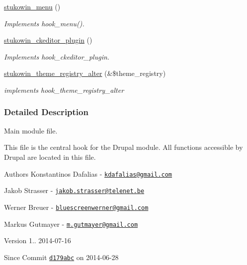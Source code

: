 \begin{DoxyCompactItemize}
\hyperlink{group___stukowin___module_ga59cfbad113b7aa2d10f0b204a5f7ba0d}{stukowin\+\_\+menu} ()
\begin{DoxyCompactList}\small\item\em Implements hook\+\_\+menu(). \end{DoxyCompactList}\item 
\hyperlink{group___drupal2_a_g_g_gae3c906d1ab9c3d8ed245d58c1ebf2a4a}{stukowin\+\_\+ckeditor\+\_\+plugin} ()
\begin{DoxyCompactList}\small\item\em Implements hook\+\_\+ckeditor\+\_\+plugin. \end{DoxyCompactList}\item 
\hyperlink{group___drupal2_a_g_g_ga3bf2203298453c41bf9a5ec48d3c2de3}{stukowin\+\_\+theme\+\_\+registry\+\_\+alter} (\&\$theme\+\_\+registry)
\begin{DoxyCompactList}\small\item\em implements hook\+\_\+theme\+\_\+registry\+\_\+alter \end{DoxyCompactList}\end{DoxyCompactItemize}


\subsubsection{Detailed Description}
Main module file. 

This file is the central hook for the Drupal module. All functions accessible by Drupal are located in this file.

\begin{DoxyAuthor}{Authors}
Konstantinos Dafalias -\/ \href{mailto:kdafalias@gmail.com}{\tt kdafalias@gmail.\+com} 

Jakob Strasser -\/ \href{mailto:jakob.strasser@telenet.be}{\tt jakob.\+strasser@telenet.\+be} 

Werner Breuer -\/ \href{mailto:bluescreenwerner@gmail.com}{\tt bluescreenwerner@gmail.\+com} 

Markus Gutmayer -\/ \href{mailto:m.gutmayer@gmail.com}{\tt m.\+gutmayer@gmail.\+com} 
\end{DoxyAuthor}
\begin{DoxyVersion}{Version}
1.. 2014-\/07-\/16 
\end{DoxyVersion}
\begin{DoxySince}{Since}
Commit \href{http://github.com/TheJake123/DrupalModul/commit/d179abcc5e05743086cd67cf1ce30b08923a7183}{\tt d179abc} on 2014-\/06-\/28 
\end{DoxySince}


